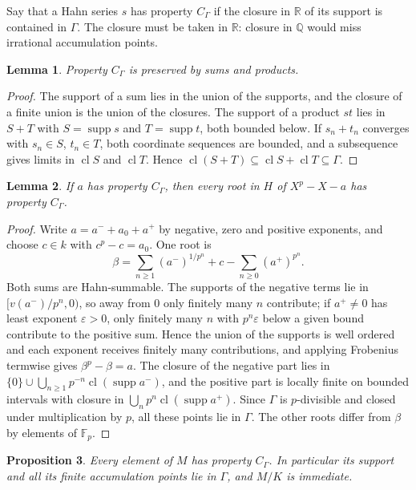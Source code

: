 \documentclass[11pt]{article}
\newtheorem{lemma}{Lemma}[section]
\newtheorem{proposition}[lemma]{Proposition}
\newcommand{\Q}{\mathbb Q}
\newcommand{\R}{\mathbb R}
\newcommand{\F}{\mathbb F}
\newcommand{\supp}{\operatorname{supp}}
\newcommand{\cl}{\operatorname{cl}}
\begin{document}
Say that a Hahn series $s$ has property $C_\Gamma$ if the closure in $\R$ of its support is contained in $\Gamma$. The closure must be taken in $\R$: closure in $\Q$ would miss irrational accumulation points.

\begin{lemma}\label{lem:closure}
Property $C_\Gamma$ is preserved by sums and products.
\end{lemma}

\begin{proof}
The support of a sum lies in the union of the supports, and the closure of a finite union is the union of the closures. The support of a product $st$ lies in $S+T$ with $S=\supp s$ and $T=\supp t$, both bounded below. If $s_n+t_n$ converges with $s_n\in S$, $t_n\in T$, both coordinate sequences are bounded, and a subsequence gives limits in $\cl S$ and $\cl T$. Hence $\cl(S+T)\subseteq\cl S+\cl T\subseteq\Gamma$.
\end{proof}

\begin{lemma}\label{lem:roots}
If $a$ has property $C_\Gamma$, then every root in $H$ of $X^p-X-a$ has property $C_\Gamma$.
\end{lemma}

\begin{proof}
Write $a=a^-+a_0+a^+$ by negative, zero and positive exponents, and choose $c\in k$ with $c^p-c=a_0$. One root is
\[
\beta=\sum_{n\ge1}(a^-)^{1/p^n}+c-\sum_{n\ge0}(a^+)^{p^n}.
\]
Both sums are Hahn-summable. The supports of the negative terms lie in $[v(a^-)/p^n,0)$, so away from $0$ only finitely many $n$ contribute; if $a^+\ne0$ has least exponent $\varepsilon>0$, only finitely many $n$ with $p^n\varepsilon$ below a given bound contribute to the positive sum. Hence the union of the supports is well ordered and each exponent receives finitely many contributions, and applying Frobenius termwise gives $\beta^p-\beta=a$. The closure of the negative part lies in $\{0\}\cup\bigcup_{n\ge1}p^{-n}\cl(\supp a^-)$, and the positive part is locally finite on bounded intervals with closure in $\bigcup_np^n\cl(\supp a^+)$. Since $\Gamma$ is $p$-divisible and closed under multiplication by $p$, all these points lie in $\Gamma$. The other roots differ from $\beta$ by elements of $\F_p$.
\end{proof}

\begin{proposition}\label{prop:tower}
Every element of $M$ has property $C_\Gamma$. In particular its support and all its finite accumulation points lie in $\Gamma$, and $M/K$ is immediate.
\end{proposition}
\end{document}
